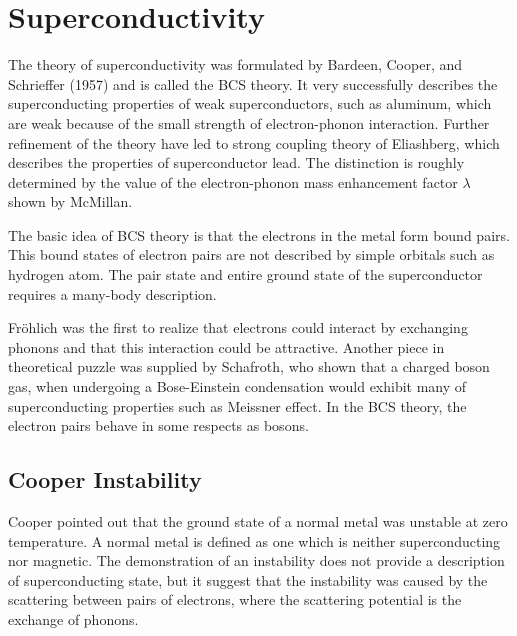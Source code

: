 \chapter{Superconductivity}
The theory of superconductivity was formulated by Bardeen, Cooper, and Schrieffer (1957) and is called the BCS theory.
It very successfully describes the superconducting properties of weak superconductors, such as aluminum, which are weak because of the small strength of electron-phonon interaction.
Further refinement of the theory have led to strong coupling theory of Eliashberg, which describes the properties of superconductor lead.
The distinction is roughly determined by the value of the electron-phonon mass enhancement factor $\lambda$ shown by McMillan.

The basic idea of BCS theory is that the electrons in the metal form bound pairs.
This bound states of electron pairs are not described by simple orbitals such as hydrogen atom.
The pair state and entire ground state of the superconductor requires a many-body description.

Fr{\"o}hlich was the first to realize that electrons could interact by exchanging phonons and that this interaction could be attractive.
Another piece in theoretical puzzle was supplied by Schafroth, who shown that a charged boson gas, when undergoing a Bose-Einstein condensation would exhibit many of superconducting properties such as Meissner effect.
In the BCS theory, the electron pairs behave in some respects as bosons.

\section{Cooper Instability} \label{se:10.1}
Cooper pointed out that the ground state of a normal metal was unstable at zero temperature.
A normal metal is defined as one which is neither superconducting nor magnetic.
The demonstration of an instability does not provide a description of superconducting state, but it suggest that the instability was caused by the scattering between pairs of electrons, where the scattering potential is the exchange of phonons.

